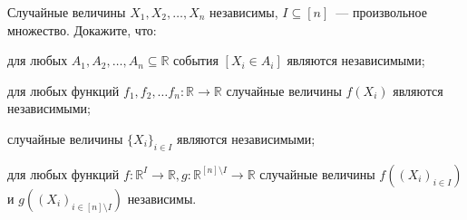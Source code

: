 Случайные величины $X_1, X_2, \dots, X_n$ независимы, $I \subseteq [n]$~--- произвольное множество. Докажите, что:
\begin{enumcyr}
    \item для любых $A_1, A_2, \dots, A_n \subseteq \mathbb{R}$ события $[X_i \in A_i]$ являются независимыми;
    \item для любых функций $f_1, f_2, \dots f_n: \mathbb{R} \to \mathbb{R}$ случайные величины $f(X_i)$ являются
	    независимыми;
    \item случайные величины $\{X_i\}_{i \in I}$ являются независимыми;
    \item для любых функций $f:\mathbb{R}^I \to \mathbb{R}, g:\mathbb{R}^{[n] \setminus I} \to \mathbb{R}$ случайные величины
	    $f((X_i)_{i\in I})$ и $g((X_i)_{i \in [n] \setminus I})$ независимы.
\end{enumcyr}

